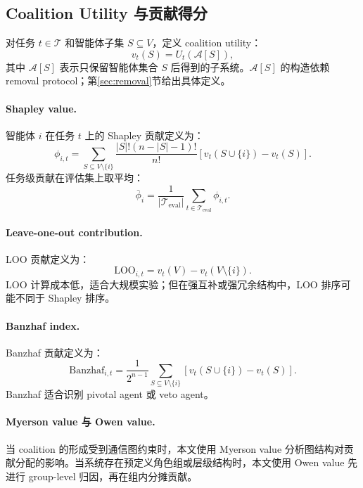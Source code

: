\documentclass[UTF8,a4paper,11pt]{ctexart}
\begin{document}
\subsection{Coalition Utility 与贡献得分}

对任务 $t\in\mathcal{T}$ 和智能体子集 $S\subseteq V$，定义 coalition utility：
\begin{equation}
 v_t(S) = U_t(\mathcal{A}[S]),
\end{equation}
其中 $\mathcal{A}[S]$ 表示只保留智能体集合 $S$ 后得到的子系统。$\mathcal{A}[S]$ 的构造依赖 removal protocol；第\ref{sec:removal}节给出具体定义。

\paragraph{Shapley value.}
智能体 $i$ 在任务 $t$ 上的 Shapley 贡献定义为：
\begin{equation}
\phi_{i,t} =
\sum_{S\subseteq V\setminus\{i\}}
\frac{|S|!(n-|S|-1)!}{n!}
\left[v_t(S\cup\{i\})-v_t(S)\right].
\end{equation}
任务级贡献在评估集上取平均：
\begin{equation}
\bar{\phi}_{i}=\frac{1}{|\mathcal{T}_{\mathrm{eval}}|}\sum_{t\in\mathcal{T}_{\mathrm{eval}}}\phi_{i,t}.
\end{equation}

\paragraph{Leave-one-out contribution.}
LOO 贡献定义为：
\begin{equation}
\mathrm{LOO}_{i,t}=v_t(V)-v_t(V\setminus\{i\}).
\end{equation}
LOO 计算成本低，适合大规模实验；但在强互补或强冗余结构中，LOO 排序可能不同于 Shapley 排序。

\paragraph{Banzhaf index.}
Banzhaf 贡献定义为：
\begin{equation}
\mathrm{Banzhaf}_{i,t}=\frac{1}{2^{n-1}}\sum_{S\subseteq V\setminus\{i\}}
\left[v_t(S\cup\{i\})-v_t(S)\right].
\end{equation}
Banzhaf 适合识别 pivotal agent 或 veto agent。

\paragraph{Myerson value 与 Owen value.}
当 coalition 的形成受到通信图约束时，本文使用 Myerson value 分析图结构对贡献分配的影响\cite{myerson1977graphs}。当系统存在预定义角色组或层级结构时，本文使用 Owen value 先进行 group-level 归因，再在组内分摊贡献\cite{owen1977values}。
\end{document}
